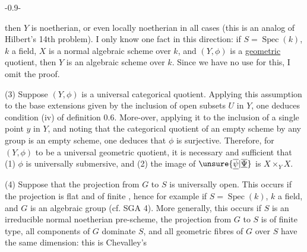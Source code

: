 
\begin{center}-0.9-\end{center}
then $Y$ is noetherian, or even locally noetherian in all cases (this is an analog of Hilbert's 14th problem). I only know one fact in this direction: if $S=\operatorname{Spec}(k)$, $k$ a field, $X$ is a normal algebraic scheme over $k$, and $(Y,\phi)$ is a \uline{geometric} quotient, then $Y$ is an algebraic scheme over $k$. Since we have no use for this, I omit the proof.

(3) Suppose $(Y,\phi)$ is a universal categorical quotient. Applying this assumption to the base extensions given by the inclusion of open subsets $U$ in $Y$, one deduces condition (iv) of definition 0.6. More-over, applying it to the inclusion of a single point $y$ in $Y$, and noting that the categorical quotient of an empty scheme by any group is an empty scheme, one deduces that $\phi$ is surjective. Therefore, for $(Y,\phi)$ to be a universal geometric quotient, it is necessary and sufficient that (1) $\phi$ is universally submersive, and (2) the image of $\unsure{\overline{\underline{\psi}}|\overline{\underline{\Psi}}}$ is $X\times_Y X$.

(4) Suppose that the projection from $G$ to $S$ is universally open. This occurs if the projection is flat and of  finite , hence for example if $S=\operatorname{Spec}(k)$, $k$ a field, and $G$ is an algebraic group (cf. SGA 4). More generally, this occurs if $S$ is an irreducible normal noetherian pre-scheme, the projection from $G$ to $S$ is  of finite type, all components of $G$ dominate $S$, and all geometric fibres of $G$ over $S$ have the same dimension: this is Chevalley's
